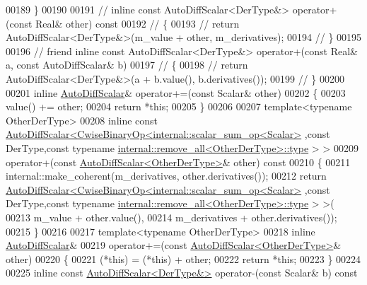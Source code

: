 \begin{DoxyCode}
00189     \}
00190 
00191 \textcolor{comment}{//     inline const AutoDiffScalar<DerType&> operator+(const Real& other) const}
00192 \textcolor{comment}{//     \{}
00193 \textcolor{comment}{//       return AutoDiffScalar<DerType&>(m\_value + other, m\_derivatives);}
00194 \textcolor{comment}{//     \}}
00195 
00196 \textcolor{comment}{//     friend inline const AutoDiffScalar<DerType&> operator+(const Real& a, const AutoDiffScalar& b)}
00197 \textcolor{comment}{//     \{}
00198 \textcolor{comment}{//       return AutoDiffScalar<DerType&>(a + b.value(), b.derivatives());}
00199 \textcolor{comment}{//     \}}
00200 
00201     \textcolor{keyword}{inline} \hyperlink{class_eigen_1_1_auto_diff_scalar}{AutoDiffScalar}& operator+=(\textcolor{keyword}{const} Scalar& other)
00202     \{
00203       value() += other;
00204       \textcolor{keywordflow}{return} *\textcolor{keyword}{this};
00205     \}
00206 
00207     \textcolor{keyword}{template}<\textcolor{keyword}{typename} OtherDerType>
00208     \textcolor{keyword}{inline} \textcolor{keyword}{const} \hyperlink{class_eigen_1_1_auto_diff_scalar}{AutoDiffScalar<CwiseBinaryOp<internal::scalar\_sum\_op<Scalar>}
      ,\textcolor{keyword}{const} DerType,\textcolor{keyword}{const} \textcolor{keyword}{typename} \hyperlink{group___sparse_core___module}{internal::remove\_all<OtherDerType>::type}
      > >
00209     operator+(\textcolor{keyword}{const} \hyperlink{class_eigen_1_1_auto_diff_scalar}{AutoDiffScalar<OtherDerType>}& other)\textcolor{keyword}{ const}
00210 \textcolor{keyword}{    }\{
00211       internal::make\_coherent(m\_derivatives, other.derivatives());
00212       \textcolor{keywordflow}{return} \hyperlink{class_eigen_1_1_auto_diff_scalar}{AutoDiffScalar<CwiseBinaryOp<internal::scalar\_sum\_op<Scalar>}
      ,\textcolor{keyword}{const} DerType,\textcolor{keyword}{const} \textcolor{keyword}{typename} \hyperlink{group___sparse_core___module}{internal::remove\_all<OtherDerType>::type}
      > >(
00213         m\_value + other.value(),
00214         m\_derivatives + other.derivatives());
00215     \}
00216 
00217     \textcolor{keyword}{template}<\textcolor{keyword}{typename} OtherDerType>
00218     \textcolor{keyword}{inline} \hyperlink{class_eigen_1_1_auto_diff_scalar}{AutoDiffScalar}&
00219     operator+=(\textcolor{keyword}{const} \hyperlink{class_eigen_1_1_auto_diff_scalar}{AutoDiffScalar<OtherDerType>}& other)
00220     \{
00221       (*this) = (*this) + other;
00222       \textcolor{keywordflow}{return} *\textcolor{keyword}{this};
00223     \}
00224 
00225     \textcolor{keyword}{inline} \textcolor{keyword}{const} \hyperlink{class_eigen_1_1_auto_diff_scalar}{AutoDiffScalar<DerType&>} operator-(\textcolor{keyword}{const} Scalar& b)\textcolor{keyword}{ const}

\end{DoxyCode}
